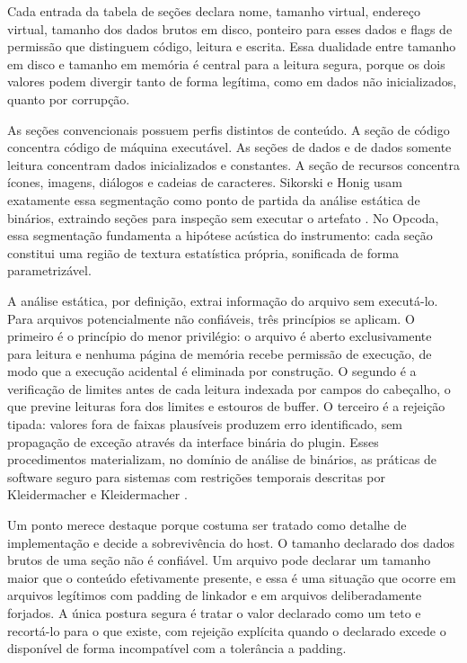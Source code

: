 \documentclass[12pt,a4paper]{article}
\begin{document}
Cada entrada da tabela de seções declara nome, tamanho virtual, endereço virtual, tamanho dos dados brutos em disco, ponteiro para esses dados e flags de permissão que distinguem código, leitura e escrita. Essa dualidade entre tamanho em disco e tamanho em memória é central para a leitura segura, porque os dois valores podem divergir tanto de forma legítima, como em dados não inicializados, quanto por corrupção.


As seções convencionais possuem perfis distintos de conteúdo. A seção de código concentra código de máquina executável. As seções de dados e de dados somente leitura concentram dados inicializados e constantes. A seção de recursos concentra ícones, imagens, diálogos e cadeias de caracteres. Sikorski e Honig usam exatamente essa segmentação como ponto de partida da análise estática de binários, extraindo seções para inspeção sem executar o artefato \cite{sikorski2012}. No Opcoda, essa segmentação fundamenta a hipótese acústica do instrumento: cada seção constitui uma região de textura estatística própria, sonificada de forma parametrizável.


A análise estática, por definição, extrai informação do arquivo sem executá-lo. Para arquivos potencialmente não confiáveis, três princípios se aplicam. O primeiro é o princípio do menor privilégio: o arquivo é aberto exclusivamente para leitura e nenhuma página de memória recebe permissão de execução, de modo que a execução acidental é eliminada por construção. O segundo é a verificação de limites antes de cada leitura indexada por campos do cabeçalho, o que previne leituras fora dos limites e estouros de buffer. O terceiro é a rejeição tipada: valores fora de faixas plausíveis produzem erro identificado, sem propagação de exceção através da interface binária do plugin. Esses procedimentos materializam, no domínio de análise de binários, as práticas de software seguro para sistemas com restrições temporais descritas por Kleidermacher e Kleidermacher \cite{kleidermacher2012}.


Um ponto merece destaque porque costuma ser tratado como detalhe de implementação e decide a sobrevivência do host. O tamanho declarado dos dados brutos de uma seção não é confiável. Um arquivo pode declarar um tamanho maior que o conteúdo efetivamente presente, e essa é uma situação que ocorre em arquivos legítimos com padding de linkador e em arquivos deliberadamente forjados. A única postura segura é tratar o valor declarado como um teto e recortá-lo para o que existe, com rejeição explícita quando o declarado excede o disponível de forma incompatível com a tolerância a padding.
\end{document}
